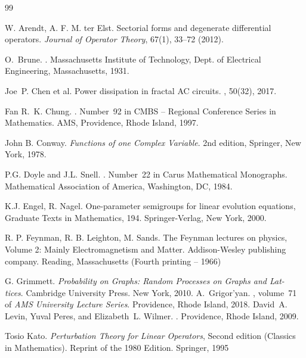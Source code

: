 \documentclass[a4paper,11pt]{amsart}
\theoremstyle{definition}
\begin{document}
\begin{thebibliography}{99}

W. Arendt, A. F. M. ter Elst. Sectorial forms and degenerate differential operators. {\em Journal of Operator Theory}, 67(1), 33–72 (2012). 


O.~Brune.
.
\newblock Massachusetts Institute of Technology, Dept. of Electrical
  Engineering, Massachusetts, 1931.



Joe~P. Chen et al.
\newblock Power dissipation in fractal {A}{C} circuits.
, 50(32),
  2017.

%
Fan R.~K. Chung.
.
\newblock Number~92 in CMBS -- Regional Conference Series in Mathematics. AMS,
  Providence, Rhode Island, 1997.

John B. Conway. {\em Functions of one Complex Variable}. 2nd edition, Springer, New
York, 1978.

P.G. Doyle and J.L. Snell.
.
\newblock Number~22 in Carus Mathematical Monographs. Mathematical Association
  of America, Washington, DC, 1984.

K.J. Engel, R. Nagel. One-parameter semigroups for linear evolution
equations, Graduate Texts in Mathematics, 194. Springer-Verlag, New
York, 2000.

 R. P. Feynman, R. B. Leighton, M. Sands. 
The Feynman lectures on physics, Volume 2: Mainly Electromagnetism and
Matter. Addison-Wesley publishing company. Reading, Massachusetts (Fourth
printing -- 1966)

G. Grimmett. {\em Probability on Graphs: Random Processes on Graphs and Lat-
tices}. Cambridge University Press. New York, 2010.
%
A.~Grigor'yan.
, volume~71 of {\em AMS
  University Lecture Series}.
\newblock Providence, Rhode Island, 2018.
%
 David~A. Levin, Yuval Peres, and Elizabeth~L. Wilmer.
.
\newblock Providence, Rhode Island, 2009.



 Tosio Kato.  
{\em Perturbation Theory for Linear Operators},
Second edition (Classics in Mathematics). Reprint of the 1980 Edition. Springer, 1995


\end{thebibliography}
\end{document}
